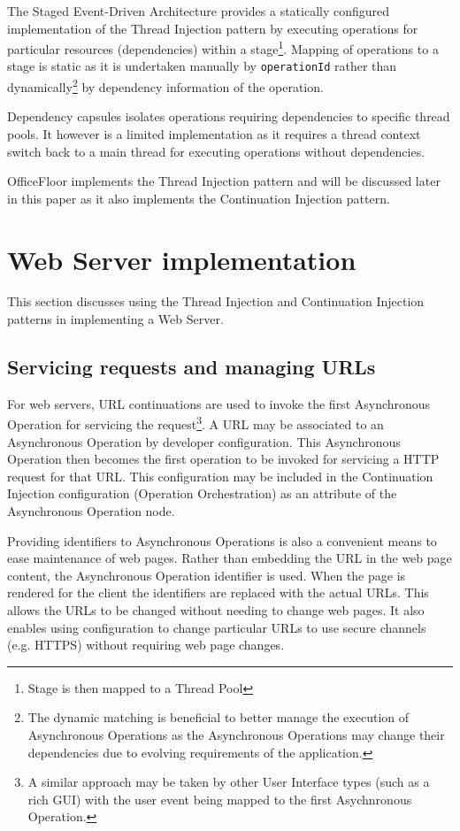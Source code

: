 \documentclass[prodmode]{style/acmlarge}
\begin{document}
The Staged Event-Driven Architecture \cite{seda} provides a statically
configured implementation of the Thread Injection pattern by executing
operations for particular resources (dependencies) within a stage\footnote{Stage
is then mapped to a Thread Pool}.  Mapping of operations to a stage is static as
it is undertaken manually by \texttt{operationId} rather than
dynamically\footnote{The dynamic matching is beneficial to better manage the
execution of Asynchronous Operations as the Asynchronous Operations may change
their dependencies due to evolving requirements of the application.} by
dependency information of the operation.

Dependency capsules \cite{dependency-capsules} isolates operations requiring
dependencies to specific thread pools.  It however is a limited implementation
as it requires a thread context switch back to a main thread for executing
operations without dependencies.

OfficeFloor \cite{officefloor} implements the Thread Injection pattern and will
be discussed later in this paper as it also implements the Continuation
Injection pattern.




\section{Web Server implementation}

This section discusses using the Thread Injection and Continuation Injection
patterns in implementing a Web Server.


\subsection{Servicing requests and managing URLs}

For web servers, URL continuations \cite{url-continuation} are used to invoke
the first Asynchronous Operation for servicing the request\footnote{A similar
approach may be taken by other User Interface types (such as a rich GUI) with
the user event being mapped to the first Asychnronous Operation.}.  A URL may be
associated to an Asynchronous Operation by developer configuration.  This
Asynchronous Operation then becomes the first operation to be invoked for
servicing a HTTP request for that URL.  This configuration may be included in
the Continuation Injection configuration (Operation Orchestration) as an
attribute of the Asynchronous Operation node.

Providing identifiers to Asynchronous Operations is also a convenient means to
ease maintenance of web pages.  Rather than embedding the URL in the web page
content, the Asynchronous Operation identifier is used.  When the page is
rendered for the client the identifiers are replaced with the actual URLs.
This allows the URLs to be changed without needing to change web pages.  It also
enables using configuration to change particular URLs to use secure channels (e.g.
HTTPS) without requiring web page changes.
\end{document}
